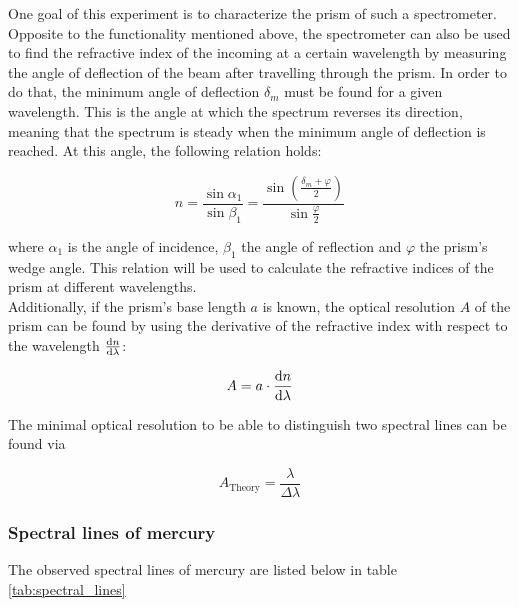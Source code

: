 \documentclass{scrreprt}
\renewcommand{\phi}{\varphi}
\begin{document}
One goal of this experiment is to characterize the prism of such a spectrometer. Opposite to the functionality mentioned above, the spectrometer can also be used to find the refractive index of the incoming at a certain wavelength by measuring the angle of deflection of the beam after travelling through the prism. In order to do that, the minimum angle of deflection $\delta_m$ must be found for a given wavelength. This is the angle at which the spectrum reverses its direction, meaning that the spectrum is steady when the minimum angle of deflection is reached. At this angle, the following relation holds:

\begin{equation}\label{eq:index}
n = \frac{\sin\alpha_1}{\sin\beta_1} = \frac{\sin{\left(\frac{\delta_m+\phi}{2} \right)}}{\sin{\frac{\phi}{2}}}
\end{equation}

where $\alpha_1$ is the angle of incidence, $\beta_1$ the angle of reflection and $\phi$ the prism's wedge angle. This relation will be used to calculate the refractive indices of the prism at different wavelengths.\\

Additionally, if the prism's base length $a$ is known, the optical resolution $A$ of the prism can be found by using the derivative of the refractive index with respect to the wavelength $\frac{\dif n}{\dif \lambda}$:

\begin{equation}\label{eq:resolution_calc}
A = a\cdot \frac{\dif n}{\dif \lambda}
\end{equation}

The minimal optical resolution to be able to distinguish two spectral lines can be found via 

\begin{equation}\label{eq:resolution_theory}
A_{\text{Theory}} = \frac{\lambda}{\Delta \lambda}
\end{equation}

\subsubsection{Spectral lines of mercury}

The observed spectral lines of mercury are listed below in table \ref{tab:spectral_lines}
\end{document}
